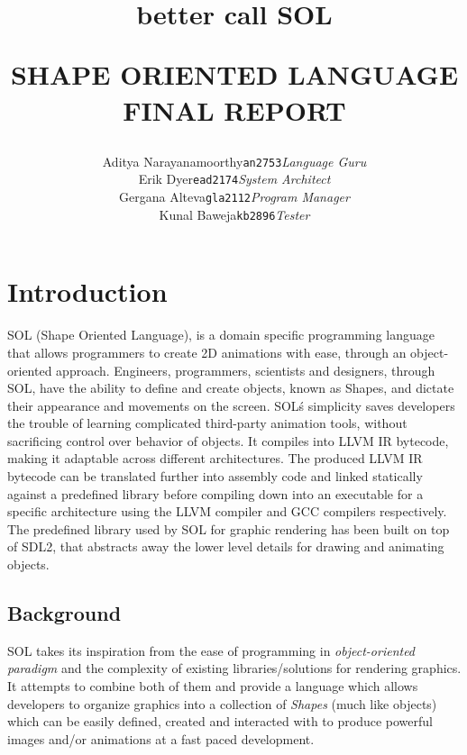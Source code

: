 \documentclass[letterpaper,12pt]{report}
\begin{document}
\title{{\small better call} {\Huge \textbf{SOL}}\\
    \begin{center}{SHAPE ORIENTED LANGUAGE FINAL REPORT}\end{center}
}

\author{
\begin{tabular}{ lc lc lc }
Aditya Narayanamoorthy & \texttt{an2753}  & \textit{Language Guru}    \\
Erik Dyer              & \texttt{ead2174} & \textit{System Architect} \\
Gergana Alteva         & \texttt{gla2112} & \textit{Program Manager}  \\
Kunal Baweja           & \texttt{kb2896}  & \textit{Tester}
\end{tabular}
}

\maketitle

\tableofcontents{}

\chapter{Introduction}
  SOL (Shape Oriented Language), is a domain specific programming language that allows programmers to create 2D animations with ease, through an object-oriented approach. Engineers, programmers, scientists and designers, through SOL, have the ability to define and create objects, known as Shapes, and dictate their appearance and movements on the screen. SOL\'s simplicity saves developers the trouble of learning complicated third-party animation tools, without sacrificing control over behavior of objects. It compiles into LLVM IR bytecode, making it adaptable across different architectures. The produced LLVM IR bytecode can be translated further into assembly code and linked statically against a predefined library before compiling down into an executable for a specific architecture using the LLVM compiler and GCC compilers respectively. The predefined library used by SOL for graphic rendering has been built on top of SDL2, that abstracts away the lower level details for drawing and animating objects.

  \section{Background}
  SOL takes its inspiration from the ease of programming in \textit{object-oriented paradigm} and the complexity of existing libraries/solutions for rendering graphics. It attempts to combine both of them and provide a language which allows developers to organize graphics into a collection of \textit{Shapes} (much like objects) which can be easily defined, created and interacted with to produce powerful images and/or animations at a fast paced development.\\
\end{document}
